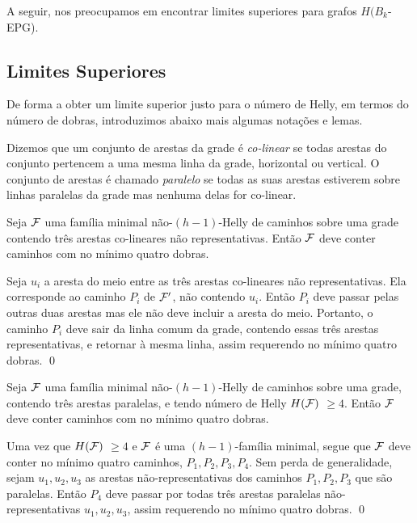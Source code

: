 A seguir, nos preocupamos em encontrar limites superiores para grafos $H(B_k$-EPG).

\subsection{Limites Superiores}\label{subsec-upper}

De forma a obter um limite superior justo para o número de Helly, em termos do número de dobras, introduzimos abaixo mais algumas notações e lemas.

Dizemos que um conjunto de arestas da grade é {\it co-linear} se todas arestas do conjunto pertencem a uma mesma linha da grade, horizontal ou vertical. O conjunto de arestas é chamado {\it paralelo} se todas as suas arestas estiverem sobre linhas paralelas da grade mas nenhuma delas for co-linear.


\begin{lemma}
\label{lemma:3colin}
Seja $\cal {F}$ uma família minimal não-$(h-1)$-Helly de caminhos sobre uma grade contendo três arestas co-lineares não representativas. Então $\cal{F}$ deve conter caminhos com no mínimo quatro dobras.
\end{lemma}

\proof
Seja  $u_i$ a aresta do meio entre as três arestas  co-lineares não representativas. Ela corresponde ao caminho $P_i$ de $\cal {F'}$, não contendo $u_i$.
 Então $P_i$ deve passar pelas outras duas arestas mas ele não deve incluir a aresta do meio. Portanto, o caminho $P_i$ deve sair da linha comum da grade, contendo essas três arestas representativas, e retornar à mesma linha, assim requerendo no mínimo quatro dobras.
\qed


\begin{lemma}
\label{lemma:3par}
Seja $\cal{F}$ uma família minimal não-$(h-1)$-Helly de caminhos sobre uma grade, contendo três arestas paralelas, e tendo número de Helly $H(\cal{F})$   $\geq 4$. Então $\cal{F}$ deve conter caminhos com no mínimo quatro dobras. 
\end{lemma}

\proof
Uma vez que $H(\cal{F}) $ $\geq 4$ e $\cal{F}$ é uma $(h-1)$-família minimal, segue que $\cal{F}$ deve conter no mínimo quatro caminhos, $P_1,P_2,P_3,P_4$. Sem perda de generalidade, sejam $u_1,u_2,u_3$ as arestas não-representativas dos caminhos $P_1,P_2,P_3$ que são paralelas. Então $P_4$ deve passar por todas três arestas paralelas não-representativas $u_1,u_2,u_3$, assim requerendo no mínimo quatro dobras. 
\qed


